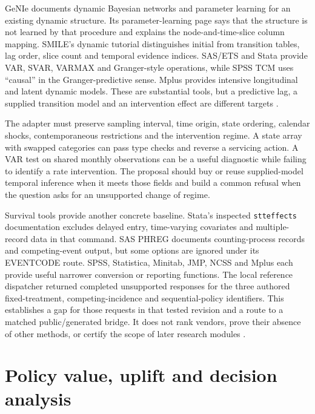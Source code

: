 GeNIe documents dynamic Bayesian networks and parameter learning for an existing
dynamic structure. Its parameter-learning page says that the structure is not
learned by that procedure and explains the node-and-time-slice column mapping.
SMILE's dynamic tutorial distinguishes initial from transition tables, lag order,
slice count and temporal evidence indices. SAS/ETS and Stata provide VAR,
SVAR, VARMAX and Granger-style operations, while SPSS TCM uses ``causal'' in
the Granger-predictive sense. Mplus provides intensive longitudinal and latent
dynamic models. These are substantial tools, but a predictive lag, a supplied
transition model and an intervention effect are different targets
\citep{exec13_ct_genie_dbn,exec13_ct_genie_learning,exec13_ct_smile_tutorial,
exec13_ct_stata_granger,exec13_ct_sas_causal,exec13_ct_ibm_tcm}.

The adapter must preserve sampling interval, time origin, state ordering,
calendar shocks, contemporaneous restrictions and the intervention regime. A
state array with swapped categories can pass type checks and reverse a
servicing action. A VAR test on shared monthly observations can be a useful
diagnostic while failing to identify a rate intervention. The proposal should
buy or reuse supplied-model temporal inference when it meets those fields and
build a common refusal when the question asks for an unsupported change of
regime.

Survival tools provide another concrete baseline. Stata's inspected
\texttt{stteffects} documentation excludes delayed entry, time-varying
covariates and multiple-record data in that command. SAS PHREG documents
counting-process records and competing-event output, but some options are
ignored under its EVENTCODE route. SPSS, Statistica, Minitab, JMP, NCSS and
Mplus each provide useful narrower conversion or reporting functions. The
local reference dispatcher returned completed unsupported responses for the
three authored fixed-treatment, competing-incidence and sequential-policy
identifiers. This establishes a gap for those requests in that tested revision and a
route to a matched public/generated bridge. It does not rank vendors, prove
their absence of other methods, or certify the scope of later research modules \citep{exec14_survival_stata,exec14_survival_sas,
exec14_survival_jmp,exec16_commercial_matrix,exec16_commercial_runtime}.

\section{Policy value, uplift and decision analysis}
\label{exec17:s8-policy}

